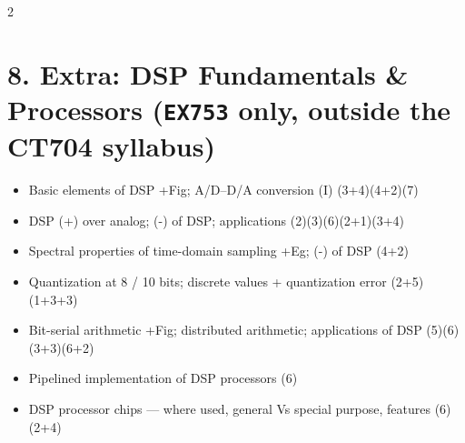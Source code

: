 \documentclass[10pt]{article}
\begin{document}
\begin{multicols}{2}
\section*{8. Extra: DSP Fundamentals \& Processors \textnormal{(\texttt{EX753} only, outside the CT704 syllabus)}}
\begin{itemize}
  \item Basic elements of DSP +Fig; A/D--D/A conversion (I) \hfill (3+4)\allowbreak(4+2)\allowbreak(7)
  \item DSP (+) over analog; (-) of DSP; applications \hfill (2)\allowbreak(3)\allowbreak(6)\allowbreak(2+1)\allowbreak(3+4)
  \item Spectral properties of time-domain sampling +Eg; (-) of DSP \hfill (4+2)
  \item Quantization at 8 / 10 bits; discrete values + quantization error \hfill (2+5)\allowbreak(1+3+3)
  \item Bit-serial arithmetic +Fig; distributed arithmetic; applications of DSP \hfill (5)\allowbreak(6)\allowbreak(3+3)\allowbreak(6+2)
  \item Pipelined implementation of DSP processors \hfill (6)
  \item DSP processor chips --- where used, general Vs special purpose, features \hfill (6)\allowbreak(2+4)
\end{itemize}

\end{multicols}
\end{document}
